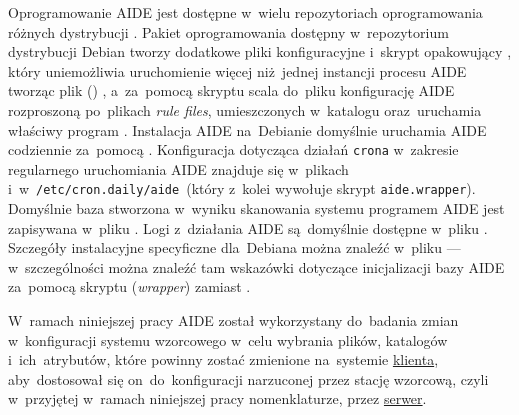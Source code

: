 \documentclass[thesis]{subfiles}
\begin{document}
Oprogramowanie AIDE jest dostępne w~wielu repozytoriach oprogramowania różnych dystrybucji . Pakiet oprogramowania dostępny w~repozytorium dystrybucji Debian tworzy dodatkowe pliki konfiguracyjne i~skrypt opakowujący , który uniemożliwia uruchomienie więcej niż~jednej instancji procesu AIDE tworząc plik () , a~za~pomocą skryptu  scala do~pliku  konfigurację AIDE rozproszoną po~plikach \emph{rule files}, umieszczonych w~katalogu  oraz~uruchamia właściwy program . Instalacja AIDE na~Debianie domyślnie uruchamia AIDE codziennie za~pomocą . Konfiguracja dotycząca działań \texttt{crona} w~zakresie regularnego uruchomiania AIDE znajduje się w~plikach  i~w~\texttt{/etc/cron.daily/aide}~(który z~kolei wywołuje skrypt \texttt{aide.wrapper}). Domyślnie baza stworzona w~wyniku skanowania systemu programem AIDE jest zapisywana w~pliku . Logi z~działania AIDE są~domyślnie dostępne w~pliku . Szczegóły instalacyjne specyficzne dla~Debiana można znaleźć w~pliku  --- w~szczególności można znaleźć tam wskazówki dotyczące inicjalizacji bazy AIDE za~pomocą skryptu  (\emph{wrapper}) zamiast .

W~ramach niniejszej pracy AIDE został wykorzystany do~badania zmian w~konfiguracji systemu wzorcowego w~celu wybrania plików, katalogów i~ich~atrybutów, które powinny zostać zmienione na~systemie \hyperref[sec:cli-app]{klienta}, aby~dostosował się on~do~konfiguracji narzuconej przez stację wzorcową, czyli w~przyjętej w~ramach niniejszej pracy nomenklaturze, przez \hyperref[sec:srv-app]{serwer}.
\end{document}

